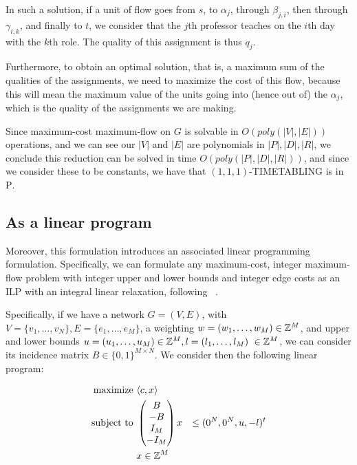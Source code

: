 In such a solution, if a unit of flow goes from $s$, to $\alpha_j$, through $\beta_{j, i}$, then through $\gamma_{i, k}$, and finally to $t$, we consider that the $j$th professor teaches on the $i$th day with the $k$th role. The quality of this assignment is thus $q_j$.

Furthermore, to obtain an optimal solution, that is, a maximum sum of the qualities of the assignments, we need to maximize the cost of this flow, because this will mean the maximum value of the units going into (hence out of) the $\alpha_j$, which is the quality of the assignments we are making.

Since maximum-cost maximum-flow on $G$ is solvable in $O(poly(|V|, |E|))$ operations, and we can see our $|V|$ and $|E|$ are polynomials in $|P|, |D|, |R|$, we conclude this reduction can be solved in time $O(poly(|P|, |D|, |R|))$, and since we consider these to be constants, we have that $(1, 1, 1)$-TIMETABLING is in \textsc{P}.

\subsection{As a linear program}
Moreover, this formulation introduces an associated linear programming formulation. Specifically, we can formulate any maximum-cost, integer maximum-flow problem with integer upper and lower bounds and integer edge costs as an ILP with an integral linear relaxation, following ~\cite{Ahuja93}.

Specifically, if we have a network $G = (V, E)$, with $V = \{v_1, \dots, v_N\}, E = \{e_1, \dots, e_M\}$, a weighting $w = (w_1, \dots, w_M) \in \mathbb{Z}^M$, and upper and lower bounds $u = (u_1, \dots, u_M) \in \Z^M, l = (l_1, \dots, l_M) \in \Z^M$, we can consider its incidence matrix $B \in \{0, 1\}^{M \times N}$. We consider then the following linear program:

\begin{alignat*}{2}
  \text{maximize }   & \langle c, x \rangle & \\
  \text{subject to } & \begin{pmatrix}
                         B\\
                        -B\\
                         I_M\\
                        -I_M
                       \end{pmatrix} x &\le (0^N, 0^N, u, -l)^t\\
                     & x \in \mathbb{Z}^M &
\end{alignat*}

